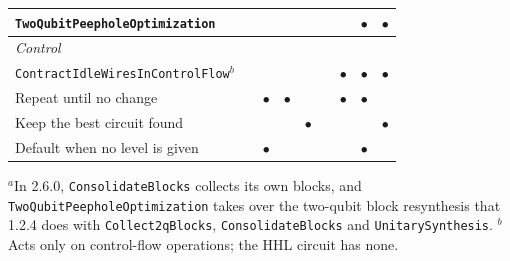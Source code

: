 \begin{table}[htbp]
\begin{tabular}{l|cccc|cccc}
\texttt{TwoQubitPeepholeOptimization}
  & & & & & & & $\bullet$ & $\bullet$ \\
\hline
\multicolumn{9}{l}{\textit{Control}} \\
\texttt{ContractIdleWiresInControlFlow}$^{b}$
  & & & & & & $\bullet$ & $\bullet$ & $\bullet$ \\
Repeat until no change
  & & $\bullet$ & $\bullet$ & & & $\bullet$ & $\bullet$ & \\
Keep the best circuit found
  & & & & $\bullet$ & & & & $\bullet$ \\
Default when no level is given
  & & $\bullet$ & & & & & $\bullet$ & \\
\hline
\end{tabular}

\smallskip
\begin{minipage}{0.92\linewidth}
\footnotesize\raggedright
$^{a}$In 2.6.0, \texttt{ConsolidateBlocks} collects its own blocks, and
\texttt{TwoQubitPeepholeOptimization} takes over the two-qubit block
resynthesis that 1.2.4 does with \texttt{Collect2qBlocks},
\texttt{ConsolidateBlocks} and \texttt{UnitarySynthesis}.
$^{b}$Acts only on control-flow operations; the HHL circuit has none.
\end{minipage}
\end{table}

